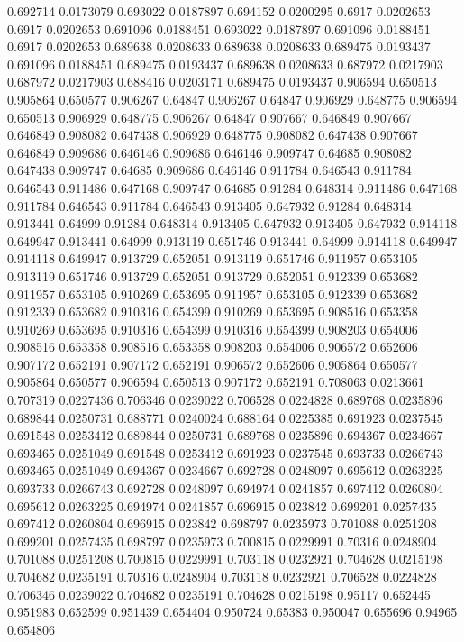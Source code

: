 0.692714 0.0173079
0.693022 0.0187897
0.694152 0.0200295
0.6917 0.0202653
0.6917 0.0202653
0.691096 0.0188451
0.693022 0.0187897
0.691096 0.0188451
0.6917 0.0202653
0.689638 0.0208633
0.689638 0.0208633
0.689475 0.0193437
0.691096 0.0188451
0.689475 0.0193437
0.689638 0.0208633
0.687972 0.0217903
0.687972 0.0217903
0.688416 0.0203171
0.689475 0.0193437
0.906594 0.650513
0.905864 0.650577
0.906267 0.64847
0.906267 0.64847
0.906929 0.648775
0.906594 0.650513
0.906929 0.648775
0.906267 0.64847
0.907667 0.646849
0.907667 0.646849
0.908082 0.647438
0.906929 0.648775
0.908082 0.647438
0.907667 0.646849
0.909686 0.646146
0.909686 0.646146
0.909747 0.64685
0.908082 0.647438
0.909747 0.64685
0.909686 0.646146
0.911784 0.646543
0.911784 0.646543
0.911486 0.647168
0.909747 0.64685
0.91284 0.648314
0.911486 0.647168
0.911784 0.646543
0.911784 0.646543
0.913405 0.647932
0.91284 0.648314
0.913441 0.64999
0.91284 0.648314
0.913405 0.647932
0.913405 0.647932
0.914118 0.649947
0.913441 0.64999
0.913119 0.651746
0.913441 0.64999
0.914118 0.649947
0.914118 0.649947
0.913729 0.652051
0.913119 0.651746
0.911957 0.653105
0.913119 0.651746
0.913729 0.652051
0.913729 0.652051
0.912339 0.653682
0.911957 0.653105
0.910269 0.653695
0.911957 0.653105
0.912339 0.653682
0.912339 0.653682
0.910316 0.654399
0.910269 0.653695
0.908516 0.653358
0.910269 0.653695
0.910316 0.654399
0.910316 0.654399
0.908203 0.654006
0.908516 0.653358
0.908516 0.653358
0.908203 0.654006
0.906572 0.652606
0.907172 0.652191
0.907172 0.652191
0.906572 0.652606
0.905864 0.650577
0.905864 0.650577
0.906594 0.650513
0.907172 0.652191
0.708063 0.0213661
0.707319 0.0227436
0.706346 0.0239022
0.706528 0.0224828
0.689768 0.0235896
0.689844 0.0250731
0.688771 0.0240024
0.688164 0.0225385
0.691923 0.0237545
0.691548 0.0253412
0.689844 0.0250731
0.689768 0.0235896
0.694367 0.0234667
0.693465 0.0251049
0.691548 0.0253412
0.691923 0.0237545
0.693733 0.0266743
0.693465 0.0251049
0.694367 0.0234667
0.692728 0.0248097
0.695612 0.0263225
0.693733 0.0266743
0.692728 0.0248097
0.694974 0.0241857
0.697412 0.0260804
0.695612 0.0263225
0.694974 0.0241857
0.696915 0.023842
0.699201 0.0257435
0.697412 0.0260804
0.696915 0.023842
0.698797 0.0235973
0.701088 0.0251208
0.699201 0.0257435
0.698797 0.0235973
0.700815 0.0229991
0.70316 0.0248904
0.701088 0.0251208
0.700815 0.0229991
0.703118 0.0232921
0.704628 0.0215198
0.704682 0.0235191
0.70316 0.0248904
0.703118 0.0232921
0.706528 0.0224828
0.706346 0.0239022
0.704682 0.0235191
0.704628 0.0215198
0.95117 0.652445
0.951983 0.652599
0.951439 0.654404
0.950724 0.65383
0.950047 0.655696
0.94965 0.654806
